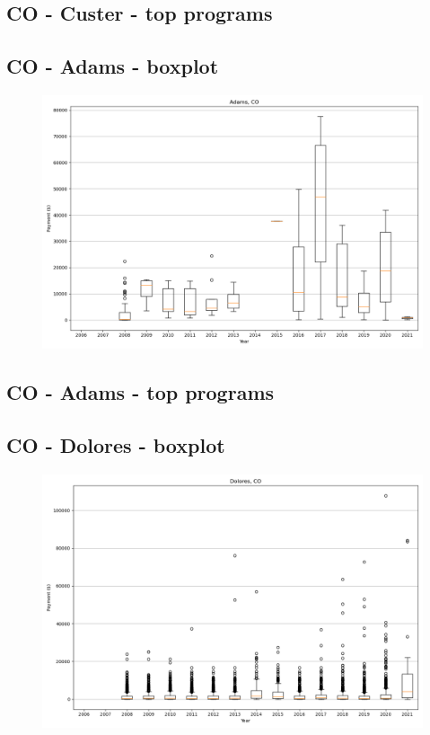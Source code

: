 \subsection*{CO - Custer - top programs}

\newpage
\subsection*{CO - Adams - boxplot}
\begin{figure}[h]
\centering
\includegraphics[width=7in]{../output/boxplots/counties/Adams-CO_boxplot.png}
\end{figure}


\subsection*{CO - Adams - top programs}

\newpage
\subsection*{CO - Dolores - boxplot}
\begin{figure}[h]
\centering
\includegraphics[width=7in]{../output/boxplots/counties/Dolores-CO_boxplot.png}
\end{figure}


